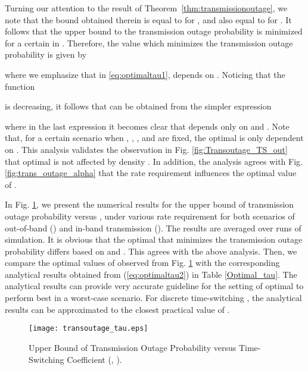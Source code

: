 \documentclass[12pt,draftclsnofoot,onecolumn]{IEEEtran}
\begin{document}
Turning our attention to the result of Theorem~\ref{thm:transmissionoutage}, we note that the bound obtained therein is equal to  for , and also equal to  for . It follows that the upper bound to the transmission outage probability is minimized for a certain  in . Therefore, the value  which minimizes the transmission outage probability is given by

where we emphasize that in \eqref{eq:optimaltau1},  depends on . Noticing that the function

is decreasing, it follows that  can be obtained from the simpler expression

where in the last expression it becomes clear that  depends only on  and . Note that, for a certain scenario when , , ,  and  are fixed, the optimal  is only dependent on . This analysis validates the observation in Fig. \ref{fig:Transoutage_TS_out} that optimal  is not affected by density . In addition, the analysis agrees with Fig. \ref{fig:trans_outage_alpha} that the rate requirement influences the optimal value of .  





In Fig. \ref{fig:Transoutage_tau}, we present the numerical results for the upper bound of transmission outage probability versus , under various rate requirement  for both scenarios of out-of-band () and in-band transmission (). The results are averaged over  runs of simulation. It is obvious that the optimal  that minimizes the transmission outage probability differs based on  and . This agrees with the above analysis. Then, we compare the optimal values of  observed from Fig. \ref{fig:Transoutage_tau} with the corresponding analytical results obtained from (\ref{eq:optimaltau2}) in Table \ref{Optimal_tau}. The analytical results can provide very accurate guideline for the setting of optimal  to perform best in a worst-case scenario. For discrete time-switching \cite{SDurrani2013}, the analytical results can be approximated to the closest practical value of .    



\begin{figure}
\centering
\texttt{[image: transoutage\_tau.eps]}
\caption{Upper Bound of Transmission Outage Probability versus Time-Switching Coefficient  (, ).} \label{fig:Transoutage_tau}
\end{figure}    
 
\end{document}
